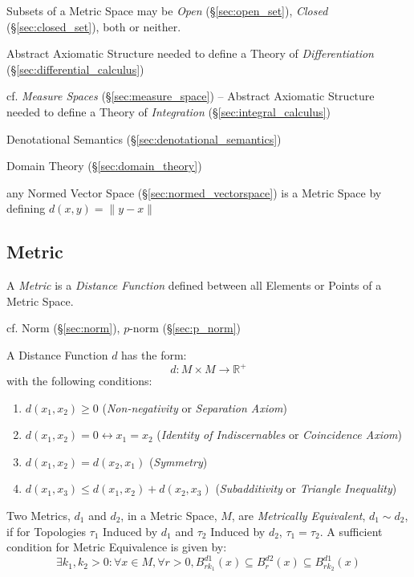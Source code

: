 Subsets of a Metric Space may be \emph{Open} (\S\ref{sec:open_set}),
\emph{Closed} (\S\ref{sec:closed_set}), both or neither.

Abstract Axiomatic Structure needed to define a Theory of \emph{Differentiation}
(\S\ref{sec:differential_calculus})

cf. \emph{Measure Spaces} (\S\ref{sec:measure_space}) -- Abstract Axiomatic
Structure needed to define a Theory of \emph{Integration}
(\S\ref{sec:integral_calculus})

Denotational Semantics (\S\ref{sec:denotational_semantics})

Domain Theory (\S\ref{sec:domain_theory})

any Normed Vector Space (\S\ref{sec:normed_vectorspace}) is a Metric Space by
defining $d(x,y) = \|y-x\|$



\subsection{Metric}\label{sec:metric}

A \emph{Metric} is a \emph{Distance Function} defined between all
Elements or Points of a Metric Space.

cf. Norm (\S\ref{sec:norm}), $p$-norm (\S\ref{sec:p_norm})

A Distance Function $d$ has the form:
\[
  d: M \times M \rightarrow \mathbb{R}^{+}
\]
with the following conditions:
\begin{enumerate}
\item $d(x_1, x_2) \geq 0$ (\emph{Non-negativity} or \emph{Separation
  Axiom})
\item $d(x_1, x_2) = 0 \leftrightarrow x_1 = x_2$ (\emph{Identity of
  Indiscernables} or \emph{Coincidence Axiom})
\item $d(x_1, x_2) = d(x_2, x_1)$ (\emph{Symmetry})
\item $d(x_1, x_3) \leq d(x_1, x_2) + d(x_2, x_3)$
  (\emph{Subadditivity} or \emph{Triangle Inequality})
\end{enumerate}
Two Metrics, $d_1$ and $d_2$, in a Metric Space, $M$, are
\emph{Metrically Equivalent}, $d_1 \sim d_2$, if for Topologies
$\tau_1$ Induced by $d_1$ and $\tau_2$ Induced by $d_2$, $\tau_1 =
\tau_2$. A sufficient condition for Metric Equivalence is given by:
\[
  \exists k_1, k_2 > 0 : \forall x \in M, \forall r > 0,
  B^{d1}_{rk_1}(x) \subseteq B^{d2}_r (x) \subseteq B^{d1}_{rk_2}(x)
\]

